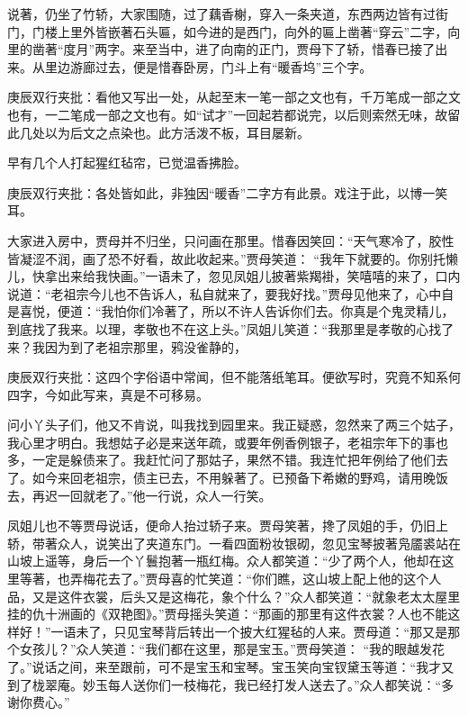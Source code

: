 \begin{parag}
    说著，仍坐了竹轿，大家围随，过了藕香榭，穿入一条夹道，东西两边皆有过街门，门楼上里外皆嵌著石头匾，如今进的是西门，向外的匾上凿著“穿云”二字，向里的凿著“度月”两字。来至当中，进了向南的正门，贾母下了轿，惜春已接了出来。从里边游廊过去，便是惜春卧房，门斗上有“暖香坞”三个字。\begin{note}庚辰双行夹批：看他又写出一处，从起至末一笔一部之文也有，千万笔成一部之文也有，一二笔成一部之文也有。如“试才”一回起若都说完，以后则索然无味，故留此几处以为后文之点染也。此方活泼不板，耳目屡新。\end{note}早有几个人打起猩红毡帘，已觉温香拂脸。\begin{note}庚辰双行夹批：各处皆如此，非独因“暖香”二字方有此景。戏注于此，以博一笑耳。\end{note}大家进入房中，贾母并不归坐，只问画在那里。惜春因笑回：“天气寒冷了，胶性皆凝涩不润，画了恐不好看，故此收起来。”贾母笑道： “我年下就要的。你别托懒儿，快拿出来给我快画。”一语未了，忽见凤姐儿披著紫羯褂，笑嘻嘻的来了，口内说道：“老祖宗今儿也不告诉人，私自就来了，要我好找。”贾母见他来了，心中自是喜悦，便道：“我怕你们冷著了，所以不许人告诉你们去。你真是个鬼灵精儿，到底找了我来。以理，孝敬也不在这上头。”凤姐儿笑道：“我那里是孝敬的心找了来？我因为到了老祖宗那里，鸦没雀静的，\begin{note}庚辰双行夹批：这四个字俗语中常闻，但不能落纸笔耳。便欲写时，究竟不知系何四字，今如此写来，真是不可移易。\end{note}问小丫头子们，他又不肯说，叫我找到园里来。我正疑惑，忽然来了两三个姑子，我心里才明白。我想姑子必是来送年疏，或要年例香例银子，老祖宗年下的事也多，一定是躲债来了。我赶忙问了那姑子，果然不错。我连忙把年例给了他们去了。如今来回老祖宗，债主已去，不用躲著了。已预备下希嫩的野鸡，请用晚饭去，再迟一回就老了。”他一行说，众人一行笑。
\end{parag}


\begin{parag}
    凤姐儿也不等贾母说话，便命人抬过轿子来。贾母笑著，搀了凤姐的手，仍旧上轿，带著众人，说笑出了夹道东门。一看四面粉妆银砌，忽见宝琴披著凫靥裘站在山坡上遥等，身后一个丫鬟抱著一瓶红梅。众人都笑道：“少了两个人，他却在这里等著，也弄梅花去了。”贾母喜的忙笑道：“你们瞧，这山坡上配上他的这个人品，又是这件衣裳，后头又是这梅花，象个什么？”众人都笑道：“就象老太太屋里挂的仇十洲画的《双艳图》。”贾母摇头笑道：“那画的那里有这件衣裳？人也不能这样好！”一语未了，只见宝琴背后转出一个披大红猩毡的人来。贾母道：“那又是那个女孩儿？”众人笑道：“我们都在这里，那是宝玉。”贾母笑道： “我的眼越发花了。”说话之间，来至跟前，可不是宝玉和宝琴。宝玉笑向宝钗黛玉等道：“我才又到了栊翠庵。妙玉每人送你们一枝梅花，我已经打发人送去了。”众人都笑说：“多谢你费心。”
\end{parag}


